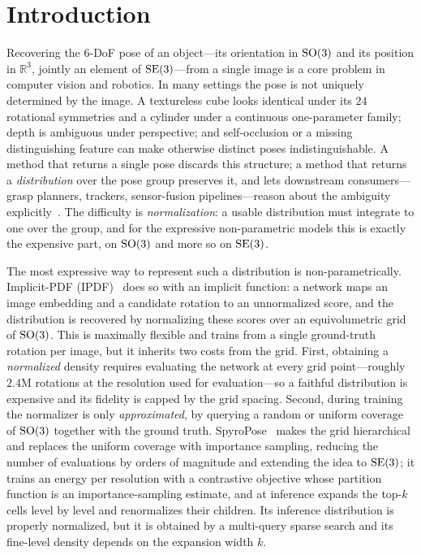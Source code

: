 \section{Introduction}
\label{sec:intro}

Recovering the 6-DoF pose of an object---its orientation in $\mathrm{SO}(3)$ and its
position in $\mathbb{R}^3$, jointly an element of $\mathrm{SE}(3)$---from a single image
is a core problem in computer vision and robotics. In many settings the pose is not
uniquely determined by the image. A textureless cube looks identical under its $24$
rotational symmetries and a cylinder under a continuous one-parameter family; depth
is ambiguous under perspective; and self-occlusion or a missing distinguishing
feature can make otherwise distinct poses indistinguishable. A method that returns a
single pose discards this structure; a method that returns a \emph{distribution}
over the pose group preserves it, and lets downstream consumers---grasp planners,
trackers, sensor-fusion pipelines---reason about the ambiguity
explicitly~\cite{murphy2021ipdf,haugaard2023spyropose}. The difficulty is
\emph{normalization}: a usable distribution must integrate to one over the group,
and for the expressive non-parametric models this is exactly the expensive part,
on $\mathrm{SO}(3)$ and more so on $\mathrm{SE}(3)$.

The most expressive way to represent such a distribution is non-parametrically.
Implicit-PDF (IPDF)~\cite{murphy2021ipdf} does so with an implicit function: a
network maps an image embedding and a candidate rotation to an unnormalized
score, and the distribution is recovered by normalizing these scores over an
equivolumetric grid of $\mathrm{SO}(3)$. This is maximally flexible and trains from a
single ground-truth rotation per image, but it inherits two costs from the grid.
First, obtaining a \emph{normalized} density requires evaluating the network at
every grid point---roughly $2.4$M rotations at the resolution used for
evaluation---so a faithful distribution is expensive and its fidelity is capped
by the grid spacing. Second, during training the normalizer is only
\emph{approximated}, by querying a random or uniform coverage of $\mathrm{SO}(3)$
together with the ground truth. SpyroPose~\cite{haugaard2023spyropose} makes the
grid hierarchical and replaces the uniform coverage with importance sampling,
reducing the number of evaluations by orders of magnitude and extending the idea
to $\mathrm{SE}(3)$; it trains an energy per resolution with a contrastive objective
whose partition function is an importance-sampling estimate, and at inference
expands the top-$k$ cells level by level and renormalizes their children. Its
inference distribution is properly normalized, but it is obtained by a
multi-query sparse search and its fine-level density depends on the expansion
width $k$.

